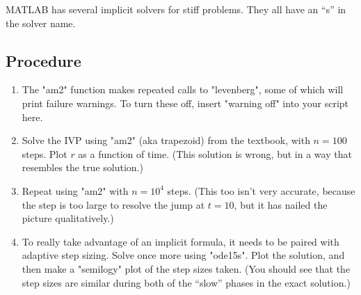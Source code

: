 \documentclass[11pt,twoside]{article}
\begin{document}
MATLAB has several implicit solvers for stiff problems. They all have an ``s'' in the solver name.

\subsection*{Procedure}
\begin{enumerate}
  \item The "am2" function makes repeated calls to "levenberg", some of which will print failure warnings. To turn these off, insert "warning off" into your script here.
  \item Solve the IVP using "am2" (aka trapezoid) from the textbook, with $n=100$ steps. Plot $r$ as a function of time. (This solution is wrong, but in a way that resembles the true solution.)
  \item Repeat using "am2" with $n=10^4$ steps. (This too isn't very accurate, because the step is too large to resolve the jump at $t=10$, but it has nailed the picture qualitatively.)
  \item To really take advantage of an implicit formula, it needs to be paired with adaptive step sizing. Solve once more using "ode15s". Plot the solution, and then make a "semilogy" plot of the step sizes taken. (You should see that the step sizes are similar during both of the ``slow'' phases in the exact solution.)
\end{enumerate}
\end{document}
